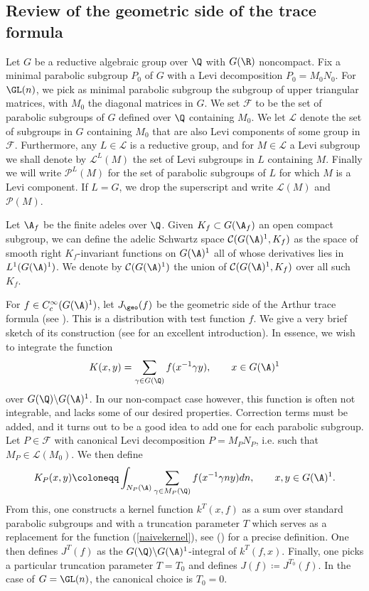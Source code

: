 
\subsection{Review of the geometric side of the trace formula}\label{tracereview}

Let $G$ be a reductive algebraic group over $\Q$ with $G(\R)$ noncompact. Fix a minimal parabolic subgroup $P_0$ of $G$ with a Levi decomposition $P_0=M_0 N_0$. For $\GL(n)$, we pick as minimal parabolic subgroup the subgroup of upper triangular matrices, with $M_0$ the diagonal matrices in $G$. We set $\mathcal{F}$ to be the set of parabolic subgroups of $G$ defined over $\Q$ containing $M_0$. We let $\mathcal{L}$ denote the set of subgroups in $G$ containing $M_0$ that are also Levi components of some group in $\mathcal{F}$. Furthermore, any $L\in\mathcal{L}$ is a reductive group, and for $M\in\mathcal{L}$ a Levi subgroup we shall denote by $\mathcal{L}^L(M)$ the set of Levi subgroups in $L$ containing $M$. Finally we will write $\mathcal{P}^L(M)$ for the set of parabolic subgroups of $L$ for which $M$ is a Levi component. If $L=G$, we drop the superscript and write $\mathcal{L}(M)$ and $\mathcal{P}(M)$.

Let $\A_f$ be the finite adeles over $\Q$. Given $K_f\subset G(\A_f)$ an open compact subgroup, we can define the adelic Schwartz space $\mathcal{C}(G(\A)^1,K_f)$ as the space of smooth right $K_f$-invariant functions on $G(\A)^1$ all of whose derivatives lies in $L^1(G(\A)^1)$. We denote by $\mathcal{C}(G(\A)^1)$ the union of $\mathcal{C}(G(\A)^1,K_f)$ over all such $K_f$.

For $f\in C_c^\infty(G(\A)^1)$, let $J_{\geo}(f)$ be the geometric side of the Arthur trace formula (see \cite{Arthur2}). This is a distribution with test function $f$. We give a very brief sketch of its construction (see \cite{Arthur0} for an excellent introduction). In essence, we wish to integrate the function
\begin{align}\label{naivekernel}
    K(x,y) = \sum_{\gamma\in G(\Q)}f(x^{-1}\gamma y), \qquad x\in G(\A)^1
\end{align}
over $G(\Q)\backslash G(\A)^1$. In our non-compact case however, this function is often not integrable, and lacks some of our desired properties. Correction terms must be added, and it turns out to be a good idea to add one for each parabolic subgroup. Let $P\in \mathcal{F}$ with canonical Levi decomposition $P=M_PN_P$, i.e. such that $M_P\in \mathcal{L}(M_0)$. We then define
\begin{align*}
    K_P(x,y)\coloneqq\int_{N_P(\A)} \sum_{\gamma\in M_P(\Q)}f(x^{-1}\gamma n y) dn, \qquad x,y\in G(\A)^1.
\end{align*}
From this, one constructs a kernel function $k^T(x,f)$ as a sum over standard parabolic subgroups and with a truncation parameter $T$ which serves as a replacement for the function (\ref{naivekernel}), see (\cite{Arthur2}) for a precise definition. One then defines $J^T(f)$ as the $G(\Q)\backslash G(\A)^1$-integral of $k^T(f,x)$. Finally, one picks a particular truncation parameter $T=T_0$ and defines $J(f)\coloneqq J^{T_0}(f)$. In the case of $G=\GL(n)$, the canonical choice is $T_0 = 0$. 

